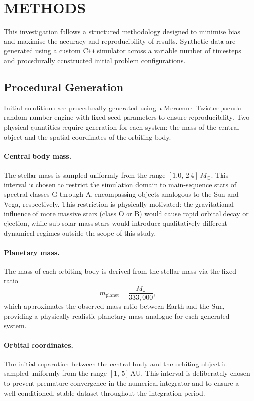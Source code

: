 \section{METHODS}

This investigation follows a structured methodology designed to minimise bias and maximise the accuracy and
reproducibility of results.
Synthetic data are generated using a custom C\texttt{++} simulator across a variable number of timesteps and
procedurally constructed initial problem configurations.

\subsection{Procedural Generation}

Initial conditions are procedurally generated using a Mersenne--Twister pseudo-random number engine with fixed seed
parameters to ensure reproducibility.
Two physical quantities require generation for each system: the mass of the central object and the spatial coordinates
of the orbiting body.

\paragraph{Central body mass.}
The stellar mass is sampled uniformly from the range $[1.0,\, 2.4]\,M_\odot$.
This interval is chosen to restrict the simulation domain to main-sequence stars of spectral classes G through A,
encompassing objects analogous to the Sun and Vega, respectively.
This restriction is physically motivated: the gravitational influence of more massive stars (class O or B) would cause
rapid orbital decay or ejection, while sub-solar-mass stars would introduce qualitatively different dynamical
regimes outside the scope of this study.

\paragraph{Planetary mass.}
The mass of each orbiting body is derived from the stellar mass via the fixed ratio
\begin{equation}
    m_\mathrm{planet} = \frac{M_\star}{333{,}000},
\end{equation}
which approximates the observed mass ratio between Earth and the Sun, providing a physically realistic planetary-mass
analogue for each generated system.

\paragraph{Orbital coordinates.}
The initial separation between the central body and the orbiting object is sampled uniformly from the
range $[1,\, 5]\,\mathrm{AU}$.
This interval is deliberately chosen to prevent premature convergence in the numerical integrator and to ensure a
well-conditioned, stable dataset throughout the integration period.

